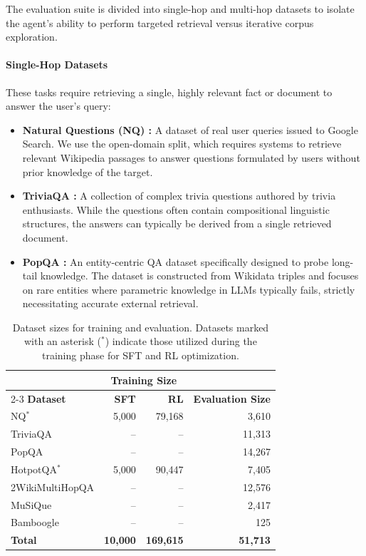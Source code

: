 \documentclass{article} %
\begin{document}
The evaluation suite is divided into single-hop and multi-hop datasets to isolate the agent's ability to perform targeted retrieval versus iterative corpus exploration.

\paragraph{Single-Hop Datasets} These tasks require retrieving a single, highly relevant fact or document to answer the user's query:
\begin{itemize}[leftmargin=1.2em]
    \item \textbf{Natural Questions (NQ) \citep{nq}:} A dataset of real user queries issued to Google Search. We use the open-domain split, which requires systems to retrieve relevant Wikipedia passages to answer questions formulated by users without prior knowledge of the target.
    \item \textbf{TriviaQA \citep{triviaqa}:} A collection of complex trivia questions authored by trivia enthusiasts. While the questions often contain compositional linguistic structures, the answers can typically be derived from a single retrieved document. 
    \item \textbf{PopQA \citep{popqa}:} An entity-centric QA dataset specifically designed to probe long-tail knowledge. The dataset is constructed from Wikidata triples and focuses on rare entities where parametric knowledge in LLMs typically fails, strictly necessitating accurate external retrieval.
\end{itemize}

\begin{table}[!b]
\caption{Dataset sizes for training and evaluation. Datasets marked with an asterisk ($^*$) indicate those utilized during the training phase for SFT and RL optimization.}
\label{tab:dataset}
\centering
\begin{tabular}{lrrr}
\toprule
 & \multicolumn{2}{c}{\textbf{Training Size}} & \\
\cmidrule(lr){2-3}
\textbf{Dataset} & \textbf{SFT} & \textbf{RL} & \textbf{Evaluation Size} \\
\midrule
NQ$^*$ & 5,000 & 79,168 & 3,610 \\
TriviaQA & -- & -- & 11,313 \\
PopQA & -- & -- & 14,267 \\
HotpotQA$^*$ & 5,000 & 90,447 & 7,405 \\
2WikiMultiHopQA & -- & -- & 12,576 \\
MuSiQue & -- & -- & 2,417 \\
Bamboogle & -- & -- & 125 \\
\midrule
\textbf{Total} & \textbf{10,000} & \textbf{169,615} & \textbf{51,713} \\
\bottomrule
\end{tabular}
\end{table}
\end{document}
